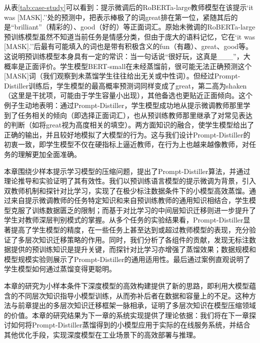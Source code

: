 \documentclass[../main.tex]{subfiles}
\begin{document}
从表\ref{tab:case-study}可以看到：提示微调后的RoBERTa-large教师模型在该提示`it was [MASK].''处的预测中，把表示棒极了的词great排在第一位，紧随其后的是“brilliant”（精彩的）、good（好的）等正面词汇。原始未微调的RoBERTa-large预训练模型虽然不知道当前任务是情感分类，但由于庞大的语料记忆，它在`it was [MASK].''后最有可能填入的词也是带有积极含义的fun（有趣）、great、good等。这说明预训练模型本身具有一定的常识：当一句话说“很好玩，这真是\_\_\_”，大概率是正面评价。学生模型BERT-small在未经蒸馏前，很可能无法正确预测这个[MASK]词（我们观察到未蒸馏学生往往给出无关或中性词）。但经过Prompt-Distiller训练后，学生模型的最高概率预测词同样变成了great，第二高为shaken（这里是干扰项，可能由于学生容量小出现），其他备选也更贴近正面倾向。这个例子生动地表明：通过Prompt-Distiller，学生模型成功地从提示微调教师那里学到了任务相关的倾向（即选择正面词汇），也从预训练教师那里继承了对常见表达的判断（如将great视为高度相关的填空）。两方面知识的融合，使学生模型给出了正确的输出，并且较好地模拟了大模型的行为。这与我们设计Prompt-Distiller的初衷一致，即学生模型不仅在硬指标上逼近教师，在行为上也越来越像教师，对任务的理解更加全面准确。

\label{sec:ch3-6-chapter-summary}
本章围绕少样本提示学习模型的压缩问题，提出了Prompt-Distiller算法，并通过理论推导和实验证明了其有效性。我们以预训练语言模型的提示微调为背景，引入双教师机制和探针对比学习，实现了在极少标注数据条件下的小模型高效蒸馏。通过来自提示微调教师的任务特定知识和来自预训练教师的通用知识相结合，学生模型克服了训练数据匮乏的限制；而基于对比学习的中间层知识迁移则进一步提升了学生对教师深层判别模式的掌握。从多个任务的实验结果看，Prompt-Distiller显著提高了学生模型的精度，在一些任务上甚至达到或超过教师模型的表现，充分验证了多层次知识迁移策略的作用。同时，我们分析了各组件的贡献，发现无标注数据提供的预训练知识是提升关键，而探针对比学习亦增强了蒸馏效果；数据规模和模型规模实验则展示了Prompt-Distiller的通用适用性。最后通过案例直观说明了学生模型如何通过蒸馏变得更聪明。

本章的研究为小样本条件下深度模型的高效构建提供了新的思路，即利用大模型蕴含的不同层次知识指导小模型训练，从而弥补后者在数据和容量上的不足。这种方法与前章提出的多层次知识迁移框架一脉相承，证明了多层次知识在模型压缩领域的价值。本章的研究结果为下一章的系统实现提供了理论依据：我们将在下一章探讨如何将Prompt-Distiller蒸馏得到的小模型应用于实际的在线服务系统，并结合其他优化手段，实现深度模型在工业场景下的高效部署与推理。
\end{document}
